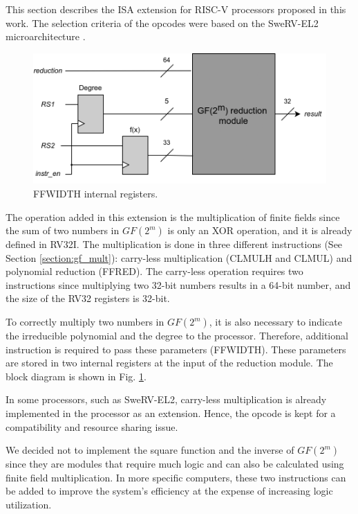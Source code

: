 This section describes the ISA extension for RISC-V processors proposed in this work. The selection criteria
of the opcodes were based on the SweRV-EL2 microarchitecture \cite{marena2019risc}. 

\begin{figure}[b]
    \centering
    \includegraphics[width=0.95\linewidth]{img/exu.png}
    \caption{FFWIDTH internal registers.}
    \label{fig:exu}
\end{figure}

The operation added in this extension is the multiplication of finite fields since the sum of two numbers in 
$GF(2^m)$ is only an XOR operation, and it is already defined in RV32I. The multiplication is done in three different 
instructions (See Section \ref{section:gf_mult}): carry-less multiplication (CLMULH and CLMUL) and polynomial reduction (FFRED). 
The carry-less operation requires two instructions since multiplying two 32-bit numbers results in a 64-bit number, 
and the size of the RV32 registers is 32-bit.

To correctly multiply two numbers in $GF(2^m)$, it is also necessary to indicate the irreducible polynomial and the 
degree to the processor. Therefore, additional instruction is required to pass these parameters (FFWIDTH). 
These parameters are stored in two internal registers at the input of the reduction module. The block diagram is shown in Fig. \ref{fig:exu}.

In some processors, such as SweRV-EL2, carry-less multiplication is already implemented in the processor as an extension. Hence, 
the opcode is kept for a compatibility and resource sharing issue.


We decided not to implement the square function and the inverse of $GF(2^m)$ since they are modules that require much logic 
and can also be calculated using finite field multiplication. In more specific computers, these two instructions can be added to 
improve the system's efficiency at the expense of increasing logic utilization.

